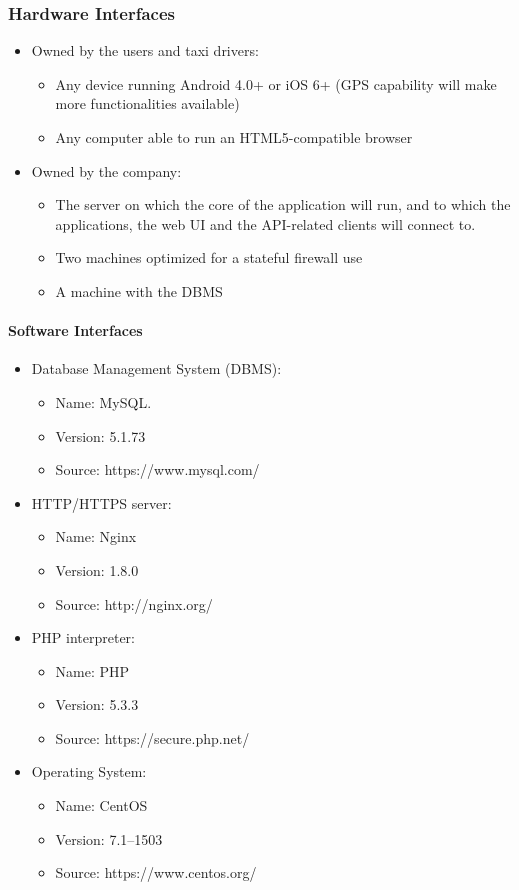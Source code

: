 \documentclass{article}
\begin{document}
\subsubsection{Hardware Interfaces}
\begin{itemize}
\item Owned by the users and taxi drivers:
	\begin{itemize}
		\item Any device running Android 4.0+ or iOS 6+ (GPS capability will make more functionalities available)
		\item Any computer able to run an HTML5-compatible browser 
	\end{itemize}
\item Owned by the company:
	\begin{itemize}
		\item The server on which the core of the application will run, and to which the applications, 
			the web UI and the API-related clients will connect to.
		\item Two machines optimized for a stateful firewall use
		\item A machine with the DBMS 
	\end{itemize}
\end{itemize}
\paragraph{Software Interfaces}
\begin{itemize}
	\item Database Management System (DBMS):
		\begin{itemize}
			\item Name: MySQL.\@
			\item Version: 5.1.73 
			\item Source: https://www.mysql.com/
		\end{itemize}
	\item HTTP/HTTPS server:
		\begin{itemize}
			\item Name: Nginx
			\item Version: 1.8.0 
			\item Source: http://nginx.org/
		\end{itemize}
	\item PHP interpreter:
		\begin{itemize}
			\item Name: PHP
			\item Version: 5.3.3 
			\item Source: https://secure.php.net/
		\end{itemize}
	\item Operating System: 
		\begin{itemize}
			\item Name: CentOS
			\item Version: 7.1--1503 
			\item Source: https://www.centos.org/ 
		\end{itemize}
\end{itemize}
\end{document}
